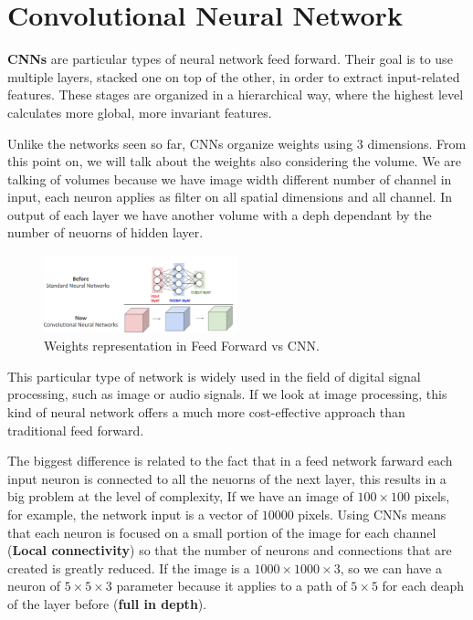 \chapter{Convolutional Neural Network}
\textbf{CNNs} are particular types of neural network feed forward. Their goal 
is to use multiple layers, stacked one on top of the other, in order to 
extract input-related features. These stages are organized in a hierarchical 
way, where the highest level calculates more global, more invariant features.

Unlike the networks seen so far, CNNs organize weights using 3 dimensions. From 
this point on, we will talk about the weights also considering the volume. We are 
talking of volumes because we have image width different number of channel in input,
each neuron applies as filter on all spatial dimensions and all channel. In output 
of each layer we have another volume with a deph dependant by the number of neuorns
of hidden layer. 


\begin{figure}[!ht]
    \centering
    \includegraphics[width=0.5\textwidth]{img/CNN/weights.png}
    \caption{Weights representation in Feed Forward vs CNN.}
    \label{fig:weights}
\end{figure}

This particular type of network is widely used in the field of digital signal 
processing, such as image or audio signals. If we look at image processing, this 
kind of neural network offers a much more cost-effective approach than traditional 
feed forward. 

The biggest difference is related to the fact that in a feed network farward each 
input neuron is connected to all the neuorns of the next layer, this results in a 
big problem at the level of complexity, If we have an image of $100 \times 100$ pixels, 
for example, the network input is a vector of $10000$ pixels. Using CNNs means that 
each neuron is focused on a small portion of the image for each channel (\textbf{Local connectivity}) 
so that the number of neurons and connections that are created is greatly reduced.
If the image is a $1000\times 1000\times 3$, so we can have a neuron of $5\times 5 \times 3$
parameter because it applies to a path of $5\times 5$ for each deaph of the layer 
before (\textbf{full in depth}). 


